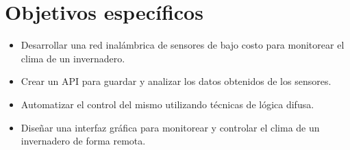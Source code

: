
\section{Objetivos específicos}
\begin{itemize}
	\item Desarrollar una red inalámbrica de sensores de bajo costo para monitorear el clima de un invernadero.
	\item Crear un API para guardar y analizar los datos obtenidos de los sensores.
	\item Automatizar el control del mismo utilizando técnicas de lógica difusa.
	\item Diseñar una interfaz gráfica para monitorear y controlar el clima de un invernadero de forma remota.
\end{itemize}